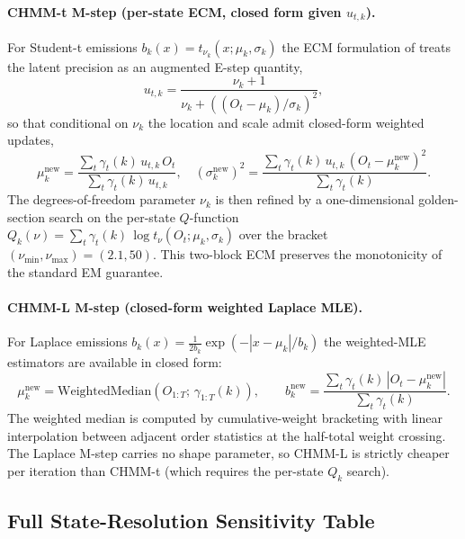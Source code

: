 \paragraph{CHMM-t M-step (per-state ECM, closed form given $u_{t,k}$).}
For Student-t emissions $b_k(x) = t_{\nu_k}(x; \mu_k, \sigma_k)$ the ECM formulation of \citet{peel2000robust, liu1995ml} treats the latent precision as an augmented E-step quantity,
\begin{equation}
    u_{t,k} = \frac{\nu_k + 1}{\nu_k + ((O_t - \mu_k)/\sigma_k)^2},
    \label{eq:tprecision_supp}
\end{equation}
so that conditional on $\nu_k$ the location and scale admit closed-form weighted updates,
\begin{equation}
    \mu_k^{\text{new}} = \frac{\sum_t \gamma_t(k)\, u_{t,k}\, O_t}{\sum_t \gamma_t(k)\, u_{t,k}},\quad
    \left(\sigma_k^{\text{new}}\right)^2 = \frac{\sum_t \gamma_t(k)\, u_{t,k}\, (O_t - \mu_k^{\text{new}})^2}{\sum_t \gamma_t(k)}.
    \label{eq:tupdate_supp}
\end{equation}
The degrees-of-freedom parameter $\nu_k$ is then refined by a one-dimensional golden-section search on the per-state $Q$-function $Q_k(\nu) = \sum_t \gamma_t(k)\, \log t_\nu(O_t; \mu_k, \sigma_k)$ over the bracket $(\nu_{\min}, \nu_{\max}) = (2.1, 50)$.
This two-block ECM preserves the monotonicity of the standard EM guarantee.

\paragraph{CHMM-L M-step (closed-form weighted Laplace MLE).}
For Laplace emissions $b_k(x) = \tfrac{1}{2 b_k} \exp(-|x - \mu_k|/b_k)$ the weighted-MLE estimators are available in closed form:
\begin{equation}
    \mu_k^{\text{new}} = \text{WeightedMedian}\!\left(O_{1:T};\, \gamma_{1:T}(k)\right),\qquad
    b_k^{\text{new}} = \frac{\sum_t \gamma_t(k)\, |O_t - \mu_k^{\text{new}}|}{\sum_t \gamma_t(k)}.
    \label{eq:lupdate_supp}
\end{equation}
The weighted median is computed by cumulative-weight bracketing with linear interpolation between adjacent order statistics at the half-total weight crossing.
The Laplace M-step carries no shape parameter, so CHMM-L is strictly cheaper per iteration than CHMM-t (which requires the per-state $Q_k$ search).

\subsection{Full State-Resolution Sensitivity Table}
\label{sec:sensitivity_table}

